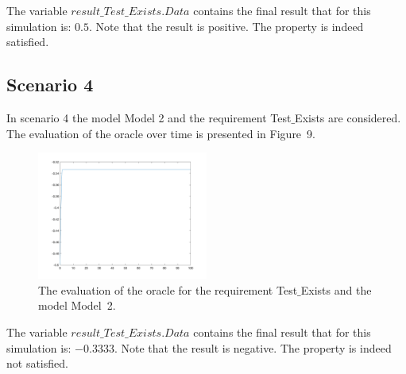 \documentclass[12pt]{extarticle}
\newcommand{\<}{\langle}
\renewcommand{\>}{\rangle}
\theoremstyle{definition}
\begin{document}
The variable  $result\_Test\_Exists.Data$  contains the final result that for this simulation is: $0.5$.
Note that the result is positive. 
The property is indeed satisfied.




\subsection{Scenario 4}
In scenario 4 the model Model 2 and the requirement Test$\_$Exists are considered. 
The evaluation of the oracle over time is presented in Figure~9.

\begin{figure}[h]
\caption{The evaluation of the oracle for the requirement Test$\_$Exists  and the model Model~2.}
  \centering
    \includegraphics[width=0.5\textwidth]{Manual/resModel2TestExists.png}
\end{figure}


The variable  $result\_Test\_Exists.Data$  contains the final result that for this simulation is: $-0.3333$.
Note that the result is negative. 
The property is indeed not satisfied.
\end{document}
